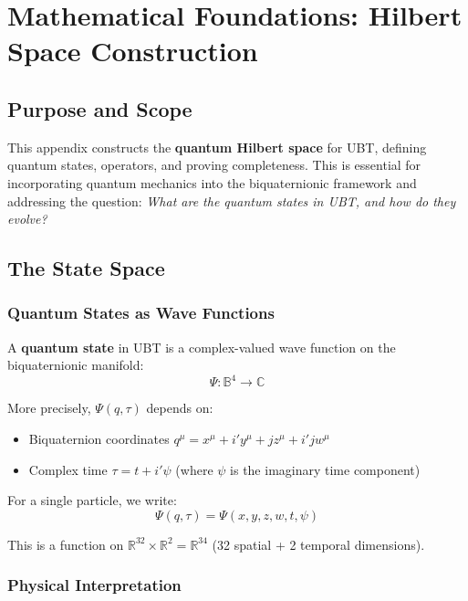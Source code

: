 \section{Mathematical Foundations: Hilbert Space Construction}
\label{app:hilbert_space}

\subsection{Purpose and Scope}

This appendix constructs the \textbf{quantum Hilbert space} for UBT, defining quantum states, operators, and proving completeness. This is essential for incorporating quantum mechanics into the biquaternionic framework and addressing the question: \emph{What are the quantum states in UBT, and how do they evolve?}

\subsection{The State Space}

\subsubsection{Quantum States as Wave Functions}

A \textbf{quantum state} in UBT is a complex-valued wave function on the biquaternionic manifold:
\begin{equation}
\Psi: \mathbb{B}^4 \to \mathbb{C}
\end{equation}

More precisely, $\Psi(q, \tau)$ depends on:
\begin{itemize}
\item Biquaternion coordinates $q^{\mu} = x^{\mu} + i' y^{\mu} + j z^{\mu} + i'j w^{\mu}$
\item Complex time $\tau = t + i' \psi$ (where $\psi$ is the imaginary time component)
\end{itemize}

For a single particle, we write:
\begin{equation}
\Psi(q, \tau) = \Psi(x, y, z, w, t, \psi)
\end{equation}

This is a function on $\mathbb{R}^{32} \times \mathbb{R}^2 = \mathbb{R}^{34}$ (32 spatial + 2 temporal dimensions).

\subsubsection{Physical Interpretation}

